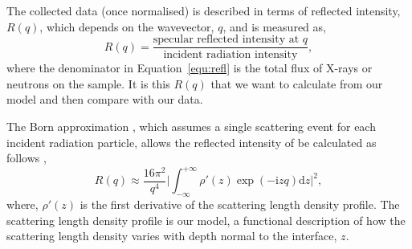 \documentclass[
 reprint,
 superscriptaddress,
 amsmath,amssymb,
 aps,
]{revtex4-1}
\begin{document}
The collected data (once normalised) is described in terms of reflected intensity, $R(q)$, which depends on the wavevector, $q$, and is measured as,
%
\begin{equation}
    R(q) = \frac{\text{specular reflected intensity at $q$}}{\text{incident radiation intensity}}, 
    \label{equ:refl}
\end{equation}
%
where the denominator in Equation~\ref{equ:refl} is the total flux of X-rays or neutrons on the sample.
It is this $R(q)$ that we want to calculate from our model and then compare with our data. 

The Born approximation \cite{born_quantenmechanik_1926}, which assumes a single scattering event for each incident radiation particle, allows the reflected intensity of be calculated as follows \cite{sivia_elementary_2011},
%
\begin{equation}
    R(q) \approx \frac{16\pi^2}{q^4} \bigg| \int^{+\infty}_{-\infty}{\rho'(z)\exp{(-\mathrm{i} zq) \text{d}z} \bigg|^2},
    \label{equ:kine}
\end{equation}
%
where, $\rho'(z)$ is the first derivative of the scattering length density profile.
The scattering length density profile is our model, a functional description of how the scattering length density varies with depth normal to the interface, $z$.
\end{document}
